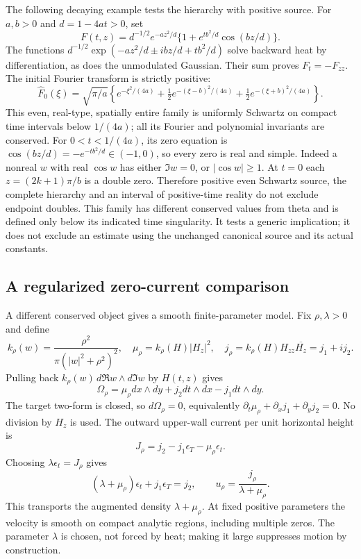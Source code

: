 The following decaying example tests the hierarchy with positive source.
For $a,b>0$ and $d=1-4at>0$, set
\begin{equation}
 F(t,z)=d^{-1/2}e^{-az^2/d}
       \{1+e^{tb^2/d}\cos(bz/d)\}.
 \label{eq:cc-gaussian-control}
\end{equation}
The functions
$d^{-1/2}\exp(-az^2/d\mathbin{\pm}ibz/d+tb^2/d)$ solve backward heat
by differentiation, as does the unmodulated Gaussian.
Their sum proves $F_t=-F_{zz}$.
The initial Fourier transform is strictly positive:
\[
 \widehat F_0(\xi)=\sqrt{\pi/a}\left\{
 e^{-\xi^2/(4a)}+\tfrac12e^{-(\xi-b)^2/(4a)}
                  +\tfrac12e^{-(\xi+b)^2/(4a)}\right\}.
\]
This even, real-type, spatially entire family is uniformly Schwartz on
compact time intervals below $1/(4a)$; all its Fourier and polynomial
invariants are conserved.  For $0<t<1/(4a)$, its zero equation is
$\cos(bz/d)=-e^{-tb^2/d}\in(-1,0)$, so every zero is real and simple.
Indeed a nonreal $w$ with real $\cos w$ has either $\Im w=0$, or
$|\cos w|\ge1$.  At $t=0$ each $z=(2k+1)\pi/b$ is a double zero.
Therefore positive even Schwartz source, the complete hierarchy and
an interval of positive-time reality do not exclude endpoint doubles.
This family has different conserved values from theta and is defined
only below its indicated time singularity.  It tests a generic
implication; it does not exclude an estimate using the unchanged
canonical source and its actual constants.

\subsection{A regularized zero-current comparison}

A different conserved object gives a smooth finite-parameter model.
Fix $\rho,\lambda>0$ and define
\begin{equation}
 k_\rho(w)=\frac{\rho^2}{\pi(|w|^2+\rho^2)^2},\quad
 \mu_\rho=k_\rho(H)|H_z|^2,\quad
 j_\rho=k_\rho(H)H_{zz}\overline{H_z}=j_1+ij_2.
 \label{eq:cc-scalar-current}
\end{equation}
Pulling back $k_\rho(w)\,d\Re w\wedge d\Im w$ by $H(t,z)$ gives
\begin{equation}
 \Omega_\rho=\mu_\rho dx\wedge dy+j_2dt\wedge dx-j_1dt\wedge dy.
 \label{eq:cc-scalar-curvature}
\end{equation}
The target two-form is closed, so $d\Omega_\rho=0$, equivalently
$\partial_t\mu_\rho+\partial_xj_1+\partial_yj_2=0$.
No division by $H_z$ is used.
The outward upper-wall current per unit horizontal height is
\begin{equation}
 J_\rho=j_2-j_1\epsilon_T-\mu_\rho\epsilon_t.
 \label{eq:cc-relative-current}
\end{equation}
Choosing $\lambda\epsilon_t=J_\rho$ gives
\begin{equation}
 (\lambda+\mu_\rho)\epsilon_t+j_1\epsilon_T=j_2,
 \qquad u_\rho=\frac{j_\rho}{\lambda+\mu_\rho}.
 \label{eq:cc-compliant-flow}
\end{equation}
This transports the augmented density $\lambda+\mu_\rho$.
At fixed positive parameters the velocity is smooth on compact analytic
regions, including multiple zeros.  The parameter $\lambda$ is chosen,
not forced by heat; making it large suppresses motion by construction.

